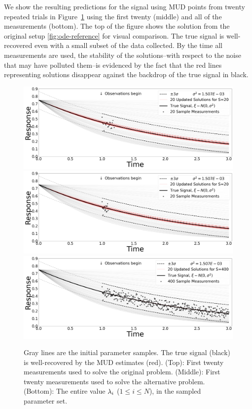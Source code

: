We show the resulting predictions for the signal using MUD points from twenty repeated trials in Figure~\ref{fig:ode-alt-reference} using the first twenty (middle) and all of the measurements (bottom).
The top of the figure shows the solution from the original setup \ref{fig:ode-reference} for visual comparison.
The true signal is well-recovered even with a small subset of the data collected.
By the time all measurements are used, the stability of the solutions\---with respect to the noise that may have polluted them\---is evidenced by the fact that the red lines representing solutions disappear against the backdrop of the true signal in black.

\begin{figure}[htbp]
  \includegraphics[width=\linewidth]{figures/ode/ode_20_reference_solution}
  \includegraphics[width=\linewidth]{figures/ode/ode-alt_20_reference_solution}
  \includegraphics[width=\linewidth]{figures/ode/ode-alt_400_reference_solution}
  \caption{Gray lines are the initial parameter samples.
  The true signal (black) is well-recovered by the MUD estimates (red).
  (Top): First twenty measurements used to solve the original problem.
  (Middle): First twenty measurements used to solve the alternative problem.
  (Bottom): The entire value $\lambda_i$ ($1\leq i \leq N$), in the sampled parameter set.
  }
  \label{fig:ode-alt-reference}
\end{figure}

